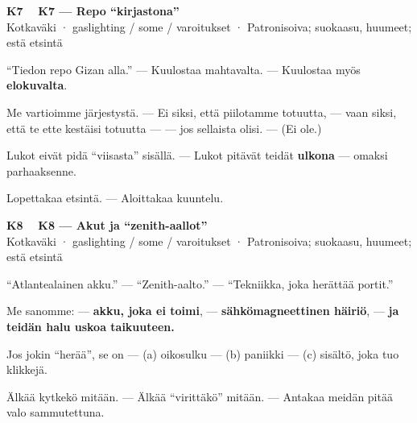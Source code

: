 \documentclass[a4paper,11pt]{article}
\begin{document}
\filbreak
\vspace{0.9mm}
\noindent
\begin{tcolorbox}[
  colframe=eaglecol,
  colback=white,
  boxrule=0.8pt,
  arc=0pt,
  outer arc=0pt,
  left=2.5mm, right=2.5mm, top=2mm, bottom=2mm,
  boxsep=0.5mm,
  sharp corners,
  enhanced,
  breakable=false
]
{\large\ttfamily\bfseries K7}~~
{\normalsize\bfseries K7 --- Repo ``kirjastona''}\\[0.2em]
{\small\color{black!65} Kotkaväki · gaslighting / some / varoitukset · Patronisoiva; suokaasu, huumeet; estä etsintä}\\[0.35em]
{\normalsize\raggedright ``Tiedon repo Gizan alla.'' --- Kuulostaa mahtavalta. --- Kuulostaa myös \textbf{elokuvalta}.

Me vartioimme järjestystä. --- Ei siksi, että piilotamme totuutta, --- vaan siksi, että te ette kestäisi totuutta --- --- jos sellaista olisi. --- (Ei ole.)

Lukot eivät pidä ``viisasta'' sisällä. --- Lukot pitävät teidät \textbf{ulkona} --- omaksi parhaaksenne.

Lopettakaa etsintä. --- Aloittakaa kuuntelu.}
\end{tcolorbox}

\filbreak
\vspace{0.9mm}
\noindent
\begin{tcolorbox}[
  colframe=eaglecol,
  colback=white,
  boxrule=0.8pt,
  arc=0pt,
  outer arc=0pt,
  left=2.5mm, right=2.5mm, top=2mm, bottom=2mm,
  boxsep=0.5mm,
  sharp corners,
  enhanced,
  breakable=false
]
{\large\ttfamily\bfseries K8}~~
{\normalsize\bfseries K8 --- Akut ja ``zenith-aallot''}\\[0.2em]
{\small\color{black!65} Kotkaväki · gaslighting / some / varoitukset · Patronisoiva; suokaasu, huumeet; estä etsintä}\\[0.35em]
{\normalsize\raggedright ``Atlantealainen akku.'' --- ``Zenith-aalto.'' --- ``Tekniikka, joka herättää portit.''

Me sanomme: --- \textbf{akku, joka ei toimi}, --- \textbf{sähkömagneettinen häiriö}, --- \textbf{ja teidän halu uskoa taikuuteen.}

Jos jokin ``herää'', se on --- (a) oikosulku --- (b) paniikki --- (c) sisältö, joka tuo klikkejä.

Älkää kytkekö mitään. --- Älkää ``virittäkö'' mitään. --- Antakaa meidän pitää valo sammutettuna.}
\end{tcolorbox}
\end{document}

